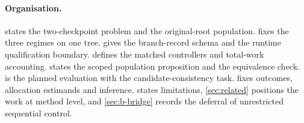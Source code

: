 \paragraph{Organisation.}
 states the two-checkpoint problem and the original-root
population.   fixes the three regimes on one tree.
 gives the branch-record schema and the runtime qualification
boundary.   defines the matched controllers and total-work
accounting.   states the scoped population proposition and
the equivalence check.   is the planned evaluation with
the candidate-consistency task.   fixes outcomes,
allocation estimands and inference.   states
limitations, \cref{sec:related} positions the work at method level, and
\cref{sec:b-bridge} records the deferral of unrestricted sequential control.
